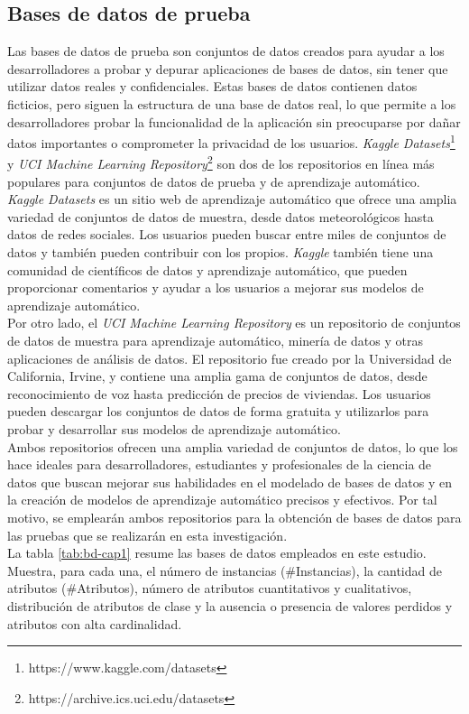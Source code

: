 \subsection{Bases de datos de prueba}
Las bases de datos de prueba son conjuntos de datos creados para ayudar a los desarrolladores a probar y depurar aplicaciones de bases de datos, sin tener que utilizar datos reales y confidenciales. Estas bases de datos contienen datos ficticios, pero siguen la estructura de una base de datos real, lo que permite a los desarrolladores probar la funcionalidad de la aplicación sin preocuparse por dañar datos importantes o comprometer la privacidad de los usuarios. \textit{Kaggle Datasets}\footnote{https://www.kaggle.com/datasets} y \textit{UCI Machine Learning Repository}\footnote{https://archive.ics.uci.edu/datasets} son dos de los repositorios en línea más populares para conjuntos de datos de prueba y de aprendizaje automático. \\
\textit{Kaggle Datasets} es un sitio web de aprendizaje automático que ofrece una amplia variedad de conjuntos de datos de muestra, desde datos meteorológicos hasta datos de redes sociales. Los usuarios pueden buscar entre miles de conjuntos de datos y también pueden contribuir con los propios. \textit{Kaggle} también tiene una comunidad de científicos de datos y aprendizaje automático, que pueden proporcionar comentarios y ayudar a los usuarios a mejorar sus modelos de aprendizaje automático. \\
Por otro lado, el \textit{UCI Machine Learning Repository} es un repositorio de conjuntos de datos de muestra para aprendizaje automático, minería de datos y otras aplicaciones de análisis de datos. El repositorio fue creado por la Universidad de California, Irvine, y contiene una amplia gama de conjuntos de datos, desde reconocimiento de voz hasta predicción de precios de viviendas. Los usuarios pueden descargar los conjuntos de datos de forma gratuita y utilizarlos para probar y desarrollar sus modelos de aprendizaje automático. \\
Ambos repositorios ofrecen una amplia variedad de conjuntos de datos, lo que los hace ideales para desarrolladores, estudiantes y profesionales de la ciencia de datos que buscan mejorar sus habilidades en el modelado de bases de datos y en la creación de modelos de aprendizaje automático precisos y efectivos. Por tal motivo, se emplearán ambos repositorios para la obtención de bases de datos para las pruebas que se realizarán en esta investigación. \\
La tabla \ref{tab:bd-cap1} resume las bases de datos empleados en este estudio. Muestra, para cada una, el número de instancias (\#Instancias), la cantidad de atributos (\#Atributos), número de atributos cuantitativos y cualitativos, distribución de atributos de clase y la ausencia o presencia de valores perdidos y atributos con alta cardinalidad.
